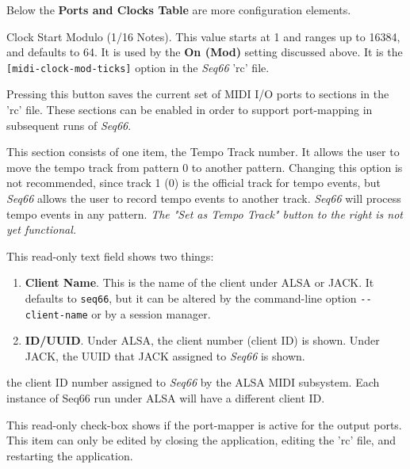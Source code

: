    Below the \textbf{Ports and Clocks Table} are more configuration elements.

   \setcounter{ItemCounter}{0}      %

   Clock Start Modulo (1/16 Notes).
   This value starts at 1 and ranges up to 16384, and defaults to 64.
   It is used by the \textbf{On (Mod)} setting discussed above.
   It is the \texttt{[midi-clock-mod-ticks]} option in the \textsl{Seq66}
   'rc' file.

   Pressing this button saves the current set of MIDI I/O ports to sections in
   the 'rc' file.  These sections can be enabled in order to support
   port-mapping in subsequent runs of \textsl{Seq66}.

   This section consists of one item, the Tempo Track number.
   It allows the user to move the tempo track from pattern 0 to
   another pattern.  Changing this option is not recommended, since track 1 (0)
   is the official track for tempo events, but \textsl{Seq66} allows the
   user to record tempo events to another track.  \textsl{Seq66} will
   process tempo events in any pattern.
   \textsl{The "Set as Tempo Track" button to the right is not yet functional.}

   This read-only text field shows two things:

   \begin{enumerate}
      \item \textbf{Client Name}.
         This is the name of the client under ALSA or JACK.  It defaults to
         \texttt{seq66}, but it can be altered by the command-line option
         \texttt{-{}-client-name} or by a session manager.
      \item \textbf{ID/UUID}.
         Under ALSA, the client number (client ID) is shown.
         Under JACK, the UUID that JACK assigned to \textsl{Seq66} is shown.
   \end{enumerate}

   the client ID number assigned to
   \textsl{Seq66} by the ALSA MIDI subsystem.
   Each instance of Seq66 run under ALSA will have a different client ID.

   This read-only check-box shows if the port-mapper is active for the output
   ports.  This item can only be edited by closing the application, editing the
   'rc' file, and restarting the application.

